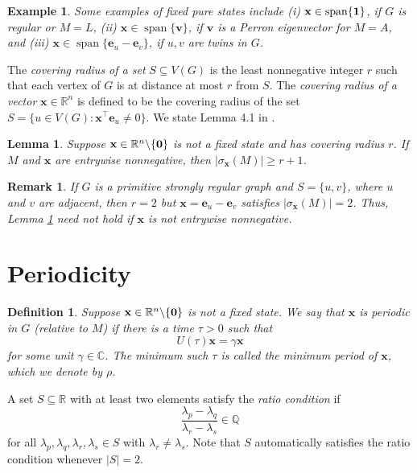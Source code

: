 \documentclass[11pt]{article}
\newtheorem{definition}[theorem]{Definition}
\newtheorem{lemma}[theorem]{Lemma}
\newtheorem{remark}[theorem]{Remark}
\newtheorem{example}[theorem]{Example}
\newcommand{\zero}{{\bf{0}}}
\newcommand{\ones}{{\bf{1}}}
\newcommand{\be}{\mathbf e}
\newcommand{\bv}{\mathbf v}
\newcommand{\bx}{\mathbf x}
\def\R{\mathbb{R}}
\begin{document}
\begin{example}
Some examples of fixed pure states include
(i) $\bx\in\operatorname{span}\{\ones\}$, if $G$ is regular or $M=L$, (ii)
$\bx\in\operatorname{span}\{\bv\}$, if $\bv$ is a Perron eigenvector for $M=A$, and (iii) $\bx\in\operatorname{span}\{\be_u-\be_v\}$, if  $u,v$ are twins in $G$.
\end{example}

The \textit{covering radius of a set} $S\subseteq V(G)$ is the least nonnegative integer $r$ such that each vertex of $G$ is at distance at most $r$ from $S$. The \textit{covering radius of a vector} $\bx\in\R^n$ is defined to be the covering radius of the set $S=\{u\in V(G):\bx^\top\be_u\neq 0\}$. We state Lemma 4.1 in \cite{godsil2012controllable}.

\begin{lemma}
\label{Lem:supp}
Suppose $\bx\in\R^n\backslash\{\zero\}$ is not a fixed state and has covering radius $r$. %
If $M$ and $\bx$ are entrywise nonnegative, then $|\sigma_{\bx}(M)|\geq r+1$. 
\end{lemma}

\begin{remark}
If $G$ is a primitive strongly regular graph and $S=\{u,v\}$, where $u$ and $v$ are adjacent, then $r=2$ but $\bx=\be_u-\be_v$ satisfies $|\sigma_{\bx}(M)|=2$. Thus, Lemma \ref{Lem:supp} need not hold if $\bx$ is not entrywise nonnegative.
\end{remark}

\section{Periodicity}
\label{Sec:per}

\begin{definition}
Suppose $\bx\in \R^n\backslash\{\zero\}$ is not a fixed state. We say that $\bx$ is \textit{periodic} in $G$ (relative to $M$) if there is a time $\tau>0$ such that
\begin{equation*}
    U(\tau)\bx=\gamma\bx
\end{equation*}
for some unit $\gamma\in\mathbb{C}$. The minimum such $\tau$ is called the \textit{minimum period} of $\bx$, which we denote by $\rho$. 
\end{definition}

A set $S\subseteq\R$ with at least two elements satisfy the \textit{ratio condition} if $$\frac{\lambda_p-\lambda_q}{\lambda_r-\lambda_s}\in\mathbb{Q}$$ for all $\lambda_p,\lambda_q,\lambda_r,\lambda_s\in S$ with $\lambda_r \ne \lambda_s$. Note that $S$ automatically satisfies the ratio condition whenever $|S|=2$. 
\end{document}
